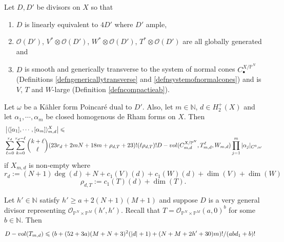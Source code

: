 \documentclass[10pt,a4paper]{amsart}
\newcommand{\Vol}{\textnormal{-vol}}
\newcommand{\bN}{\mathbb{N}}
\newcommand{\bP}{\mathbb{P}}
\newcommand{\calO}{\mathcal{O}}
\renewcommand{\geq}{\geqslant}
\renewcommand{\leq}{\leqslant}
\begin{document}
\begin{lemma} \label{lemmavolumeboundsimplyGWbounds}
	Let $D, D'$ be divisors on $X$ so that
	\begin{enumerate}
		\item $D$ is linearly equivalent to $4D'$ where $D'$ ample,
		\item $\calO(D')$, $V^* \otimes \calO(D')$, $W^* \otimes \calO(D')$, $T^* \otimes \calO(D')$ are all globally generated and
		\item $D$ is smooth and generically transverse to the system of normal cones $C^{X/\bP^N}_\bullet$ (Definitions \ref{defngenericallytransverse} and \ref{defnsystemofnormalcones})
		      and is $V$, $T$ and $W$-large (Definition \ref{defncompactieab}).
	\end{enumerate}
	Let $\omega$ be a K\"{a}hler form Poincar\'{e} dual to $D'$.
	Also, let $m \in \bN$, $d \in H_2^+(X)$ and let $\alpha_1,\cdots,\alpha_m$ be closed homogenous de Rham forms on $X$.
	Then
	\begin{equation} \label{eqndvolinequalityforbundles}
		\begin{aligned}
			 & \left| \langle [\alpha_1],\cdots,[\alpha_m] \rangle^X_{m,d} \right| \leq \\ &
			\sum_{\ell = 0}^{r_d} \sum_{k=0}^{r_d-\ell}  {k+\ell \choose \ell} (23r_d + 2 m N + 18m +\rho_{d,T}+23)! (\ell\rho_{d,T})!
			D\Vol(C^{X/\bP^N}_{m,d}, T_{m,d}^\ell, W_{m,d})
			\prod_{j=1}^m |\alpha_j|_{C^0,\omega}
		\end{aligned}
	\end{equation}
	if $X_{m,d}$ is non-empty
	where
	\begin{equation} \label{eqnaefaefforrd}
		r_d :=  (N+1)\deg(d) + N + c_1(V)(d) + c_1(W)(d) + \dim(V) + \dim(W)
	\end{equation}
	\begin{equation} \label{eqnrhodT}
		\rho_{d,T} := c_1(T)(d) + \dim(T).
	\end{equation}
\end{lemma}

\begin{prop} \label{propdvolumeboundsproductsfo}
	Let $h' \in \bN$ satisfy $h' \geq a+2(N+1)(M+1)$ and suppose $D$ is a very general divisor representing $\calO_{\bP^N \times \bP^M}(h',h')$.
	Recall that $T = \calO_{\bP^N \times \bP^M}(a,0)^b$ for some $b \in \bN$.
	Then
	\begin{equation} \label{eqneafeafaeifaoeg}
		\begin{aligned}
			 & D\Vol(T_{m,d}) \leq  (b+(52+3a)(M+N+3)^2(|d|+1) + (N+M+2h'+30)m)!
			/ (abd_1 + b)!
		\end{aligned}
	\end{equation}
\end{prop}
\end{document}
